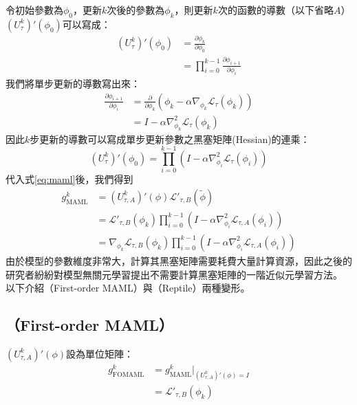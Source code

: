 令初始參數為$\phi_{0}$，更新$k$次後的參數為$\phi_{k}$，則更新$k$次的函數的導數（以下省略$A$）$\left( U_{\tau}^{k} \right)' \left(\phi_{0}\right)$可以寫成：
\begin{align}
    \left( U_{\tau}^{k} \right)' \left(\phi_{0}\right) &= \frac{\partial \phi_{k}}{\partial \phi_{0}} \\
                                                       &= \prod\limits_{i=0}^{k-1} \frac{\partial \phi_{i+1}}{\partial \phi_{i}} 
\end{align}
我們將單步更新的導數寫出來：
\begin{align}
    \frac{\partial \phi_{i+1}}{\partial \phi_{i}} &= \frac{\partial}{\partial \phi_{k}} \left( \phi_{k} - \alpha \nabla_{\phi_{k}} \mathcal{L}_{\tau} \left( \phi_{k} \right) \right) \\
                                                  &= I - \alpha \nabla^{2}_{\phi_{k}} \mathcal{L}_{\tau} \left( \phi_{k} \right)
\end{align}
因此$k$步更新的導數可以寫成單步更新參數之黑塞矩陣(Hessian)的連乘：
\begin{equation}
    \left( U_{\tau}^{k} \right)' \left(\phi_{0}\right) = \prod\limits_{i=0}^{k-1}  \left( I - \alpha \nabla^{2}_{\phi_{i}} \mathcal{L}_{\tau} \left( \phi_{i} \right) \right)
\end{equation}
代入式\ref{eq:maml}後，我們得到
\begin{align}
    g_{\mathrm{MAML}}^{k} &= \left(U_{\tau, A}^{k}\right)' (\phi) \mathcal{L'}_{\tau, B} ( \widetilde{\phi} ) \\
                      &= \mathcal{L'}_{\tau, B} ( \phi_{k} ) \prod\limits_{i=0}^{k-1}  \left( I - \alpha \nabla^{2}_{\phi_{i}} \mathcal{L}_{\tau, A} \left( \phi_{i} \right) \right) \\
                      &= \nabla_{\phi_{k}} \mathcal{L}_{\tau, B} ( \phi_{k} ) \prod\limits_{i=0}^{k-1}  \left( I - \alpha \nabla^{2}_{\phi_{i}} \mathcal{L}_{\tau, A} \left( \phi_{i} \right) \right)
\end{align}
由於模型的參數維度非常大，計算其黑塞矩陣需要耗費大量計算資源，因此之後的研究者紛紛對模型無關元學習提出不需要計算黑塞矩陣的一階近似元學習方法。
以下介紹\fomaml （First-order MAML）與\reptile （Reptile）\cite{nichol2018first}兩種變形。
\subsection{\fomaml （First-order MAML）}
$\left(U_{\tau, A}^{k}\right)' (\phi)$設為單位矩陣：
\begin{align}
    g_{\mathrm{FOMAML}}^{k} &= g_{\mathrm{MAML}}^{k}\bigg|_{\left(U_{\tau, A}^{k}\right)' (\phi) = I} \\
    &= \mathcal{L'}_{\tau, B} (\phi_{k} )
\end{align}
